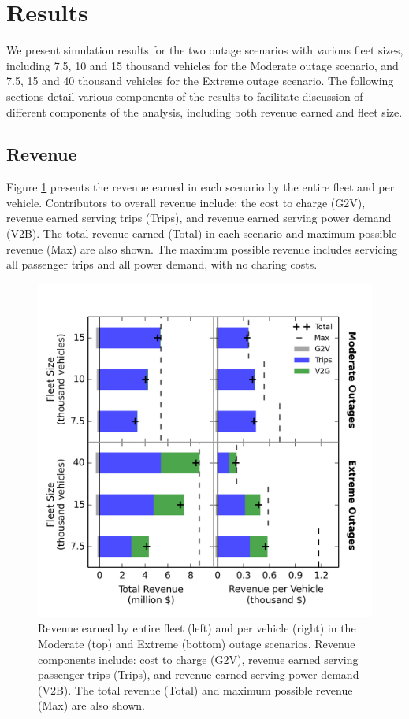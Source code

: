 \documentclass[journal]{IEEEtran}
\begin{document}
\section{Results}
We present simulation results for the two outage scenarios with various fleet sizes, including 7.5, 10 and 15 thousand vehicles for the Moderate outage scenario, and 7.5, 15 and 40 thousand vehicles for the Extreme outage scenario. The following sections detail various components of the results to facilitate discussion of different components of the analysis, including both revenue earned and fleet size.

\subsection{Revenue}
Figure \ref{fig:revenue_bar} presents the revenue earned in each scenario by the entire fleet and per vehicle. Contributors to overall revenue include: the cost to charge (G2V), revenue earned serving trips (Trips), and revenue earned serving power demand (V2B). The total revenue earned (Total) in each scenario and maximum possible revenue (Max) are also shown. The maximum possible revenue includes servicing all passenger trips and all power demand, with no charing costs.

\begin{figure}[!htbp]
  \includegraphics[width=\linewidth]{plots/full_revenue_barchart.png}
  \caption{Revenue earned by entire fleet (left) and per vehicle (right) in the Moderate (top) and Extreme (bottom) outage scenarios. Revenue components include: cost to charge (G2V), revenue earned serving passenger trips (Trips), and revenue earned serving power demand (V2B). The total revenue (Total) and maximum possible revenue (Max) are also shown.}
  \label{fig:revenue_bar}
\end{figure}
\end{document}
